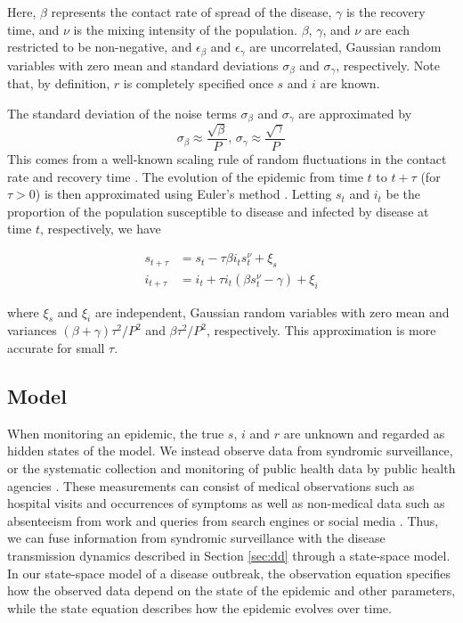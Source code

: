 \documentclass{elsarticle}
\begin{document}
\noindent Here, $\beta$ represents the contact rate of spread of the disease, $\gamma$ is the recovery time, and $\nu$ is the mixing intensity of the population.  $\beta$, $\gamma$, and $\nu$ are each restricted to be non-negative, and $\epsilon_\beta$ and $\epsilon_\gamma$ are uncorrelated, Gaussian random variables with zero mean and standard deviations $\sigma_\beta$ and $\sigma_\gamma$, respectively.  Note that, by definition, $r$ is completely specified once $s$ and $i$ are known.

The standard deviation of the noise terms $\sigma_\beta$ and $\sigma_\gamma$ are approximated by
\[\sigma_\beta \approx \frac{\sqrt{\beta}}{P} \mbox{, } \sigma_\gamma \approx \frac{\sqrt{\gamma}}{P}\]
This comes from a well-known scaling rule of random fluctuations in the contact rate and recovery time \citep{ovaskainen2010extinction, herwaarden1995stochepid, dangerfield2009stochepid}.  The evolution of the epidemic from time $t$ to $t + \tau$ (for $\tau > 0$) is then approximated using Euler's method \citep{atkinson1989numericalanalysis}.  Letting $s_t$ and $i_t$ be the proportion of the population susceptible to disease and infected by disease at time $t$, respectively, we have

\begin{align}
s_{t+\tau} &= s_t - \tau\beta i_ts^\nu_t + \xi_s \label{eqn:s} \\
i_{t+\tau} &= i_t + \tau i_t(\beta s^\nu_t - \gamma) + \xi_i \label{eqn:i}
\end{align}

\noindent where $\xi_s$ and $\xi_i$ are independent, Gaussian random variables with zero mean and variances $(\beta + \gamma)\tau^2/P^2$ and $\beta\tau^2/P^2$, respectively.  This approximation is more accurate for small $\tau$.

\subsection{Model \label{sec:model}}

When monitoring an epidemic, the true $s$, $i$ and $r$ are unknown and regarded as hidden states of the model.  We instead observe data from syndromic surveillance, or the systematic collection and monitoring of public health data by public health agencies \citep{wagner2006biosurveillance, wilson2006synsurveillance}.  These measurements can consist of medical observations such as hospital visits and occurrences of symptoms as well as non-medical data such as absenteeism from work and queries from search engines or social media \citep{chew2010twitter, schuster2010searchquery, signorini2011twitter, Gins:Mohe:Pate:Bram:Smol:Bril:dete:2009}.  Thus, we can fuse information from syndromic surveillance with the disease transmission dynamics described in Section \ref{sec:dd} through a state-space model.  In our state-space model of a disease outbreak, the observation equation specifies how the observed data depend on the state of the epidemic and other parameters, while the state equation describes how the epidemic evolves over time.
\end{document}
